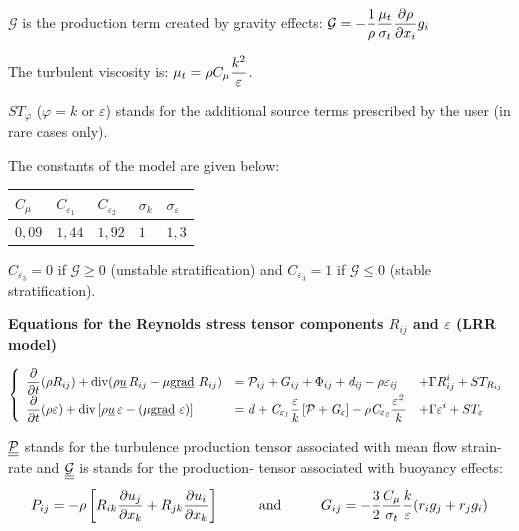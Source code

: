 $\mathcal{G}$ is the production term created by gravity effects: $%
\displaystyle \mathcal{G}=-\frac{1}{\rho}\frac{\mu_t}{\sigma_t} \frac{%
\partial\rho}{\partial x_i}g_i$

The turbulent viscosity is: $\displaystyle \mu_t=\rho C_\mu\frac{k^2}{%
\varepsilon}$.

$ST_{\varphi }$ ($\varphi =k$ or $\varepsilon $) stands for the additional
source terms prescribed by the user (in rare cases only).

The constants of the model are given below:\newline
\begin{table}[htp]
\begin{center}
\begin{tabular}{|p{}|p{}|p{}|p{}|p{}|}
\hline
$C_\mu$ & $C_{\varepsilon_1}$ & $C_{\varepsilon_2}$ & $\sigma_k$ & $%
\sigma_\varepsilon$ \\ \hline
$0,09$ & $1,44$ & $1,92$ & $1$ & $1,3$ \\ \hline
\end{tabular}%
\end{center}
\end{table}

$C_{\varepsilon_3}=0$ if $\mathcal{G}\geqslant0$ (unstable stratification)
and $C_{\varepsilon_3}=1$ if $\mathcal{G}\leqslant0$ (stable stratification).

\clearpage \textbf{Equations for the Reynolds stress tensor components $%
R_{ij}$ and $\varepsilon$ (LRR model)}

\begin{equation}
\left\{
\begin{array}{lll}
\displaystyle\frac{\partial }{\partial t}(\rho R_{ij})+\dive(\rho \vect{u}%
\,R_{ij}-\mu \grad{R_{ij}}) & =\mathcal{P}_{ij}+G_{ij}+\Phi _{ij}+\mathit{{d}%
_{ij}-\rho \varepsilon _{ij}} & \displaystyle+\Gamma R_{ij}^{i}+ST_{R_{ij}}
\\
\displaystyle\frac{\partial }{\partial t}(\rho \varepsilon )+\dive\left[
\rho \vect{u}\,\varepsilon -(\mu \grad{\varepsilon})\right]  & =\displaystyle%
\mathit{{d}+C_{\varepsilon _{1}}\frac{\varepsilon }{k}\left[ \mathcal{P}%
+G_{\varepsilon }\right] -\rho C_{\varepsilon _{2}}\frac{\varepsilon ^{2}}{k}%
} & \displaystyle+\Gamma \varepsilon ^{i}+ST_{\varepsilon }%
\end{array}%
\right.
\end{equation}

$\underline{\underline{\mathcal{P}}}$ stands for the turbulence production tensor associated
with mean flow strain-rate and $\underline{\underline{\mathcal{G}}}$ is stands for the
production- tensor associated with buoyancy effects:
\begin{equation}
\displaystyle P_{ij}=\displaystyle-\rho \left[ R_{ik}\frac{\partial u_{j}}{%
\partial x_{k}}+R_{jk}\frac{\partial u_{i}}{\partial x_{k}}\right] \text{%
\hspace*{1cm}and\hspace*{1cm}}G_{ij}=-\frac{3}{2}\frac{C_{\mu }}{\sigma _{t}}%
\frac{k}{\varepsilon }(r_{i}g_{j}+r_{j}g_{i})
\end{equation}

